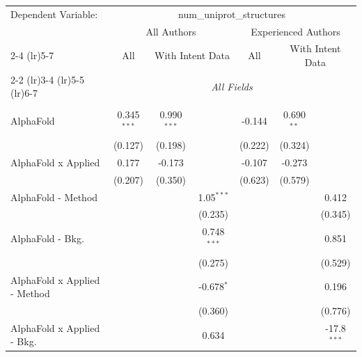 \begingroup
\centering
\begin{tabular}{lcccccc}
   \tabularnewline \midrule \midrule
   Dependent Variable: & \multicolumn{6}{c}{num\_uniprot\_structures}\\
 & \multicolumn{3}{c}{All Authors} & \multicolumn{3}{c}{Experienced Authors} \\
\cmidrule(lr){2-4} \cmidrule(lr){5-7}
 & \multicolumn{1}{c}{All} & \multicolumn{2}{c}{With Intent Data} & \multicolumn{1}{c}{All} & \multicolumn{2}{c}{With Intent Data} \\
\cmidrule(lr){2-2} \cmidrule(lr){3-4} \cmidrule(lr){5-5} \cmidrule(lr){6-7}
 & \multicolumn{6}{c}{\textit{All Fields}} \\ \\
   AlphaFold                      & 0.345$^{***}$ & 0.990$^{***}$ &               & -0.144         & 0.690$^{**}$  &   \\   
                                  & (0.127)       & (0.198)       &               & (0.222)        & (0.324)       &   \\   
   AlphaFold x Applied            & 0.177         & -0.173        &               & -0.107         & -0.273        &   \\   
                                  & (0.207)       & (0.350)       &               & (0.623)        & (0.579)       &   \\   
   AlphaFold - Method             &               &               & 1.05$^{***}$  &                &               & 0.412\\   
                                  &               &               & (0.235)       &                &               & (0.345)\\   
   AlphaFold - Bkg.               &               &               & 0.748$^{***}$ &                &               & 0.851\\   
                                  &               &               & (0.275)       &                &               & (0.529)\\   
   AlphaFold x Applied - Method   &               &               & -0.678$^{*}$  &                &               & 0.196\\   
                                  &               &               & (0.360)       &                &               & (0.776)\\   
   AlphaFold x Applied - Bkg.     &               &               & 0.634         &                &               & -17.8$^{***}$\\   

\end{tabular}
